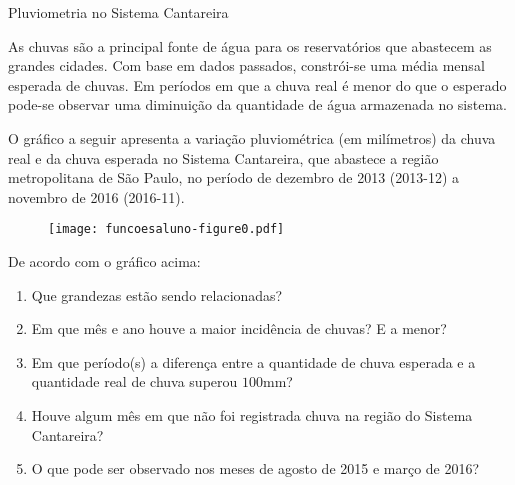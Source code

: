 \documentclass[extrafontsizes, twoside, 11pt, openright, final]{memoir}
\begin{document}
\begin{task}{ Pluviometria no Sistema Cantareira}
	\label{\detokenize{AF106-0:atividade-pluviometria-no-sistema-cantareira}}\label{\detokenize{AF106-0:ativ-funcoes-pluviometria}}

	As chuvas são a principal fonte de água para os reservatórios que abastecem as grandes cidades. Com base em dados passados, constrói-se uma média mensal esperada de chuvas. Em períodos em que a chuva real é menor do que o esperado pode-se observar uma diminuição da quantidade de água armazenada no sistema.

	O gráfico a seguir apresenta a variação pluviométrica (em milímetros) da chuva real e da chuva esperada no Sistema Cantareira, que abastece a região metropolitana de São Paulo, no período de dezembro de 2013 (2013-12) a novembro de 2016 (2016-11).

	\begin{figure}[H]
		\begin{center}
			\texttt{[image: funcoesaluno-figure0.pdf]}
		\end{center}
	\end{figure}

	De acordo com o gráfico acima:
	\begin{enumerate}
		\item Que grandezas estão sendo relacionadas?
		\item Em que mês e ano houve a maior incidência de chuvas? E a menor?
		\item Em que período(s) a diferença entre a quantidade de chuva esperada e a quantidade real de chuva superou $100$mm?
		\item Houve algum mês em que não foi registrada chuva na região do Sistema Cantareira?
		\item O que pode ser observado nos meses de agosto de 2015 e março de 2016?
	\end{enumerate}
\end{task}
\end{document}
